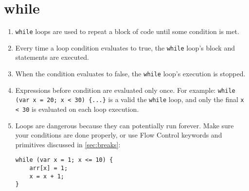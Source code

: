 \section{while}
\label{sec:while}

\begin{enumerate}
\begin{lstlisting}[numbers=none]
while (expression; expression; ... ; condition)  {
	statements 
}
\end{lstlisting}
	\item \lstinline|while| loops are used to repeat a block of code until some condition is met.
	\item Every time a loop condition evaluates to true, the \lstinline|while| loop's block and statements are executed.
	\item When the condition evaluates to false, the \lstinline|while| loop's execution is stopped.
	\item Expressions before condition are evaluated only once. For example: \lstinline|while (var x = 20; x < 30) {...}| is a valid the \lstinline|while| loop, and only the final \lstinline|x < 30| is evaluated on each loop execution.
	\item Loops are dangerous because they can potentially run forever. Make sure your conditions are done properly, or use Flow Control keywords and primitives discussed in \ref{sec:breaks}:
\begin{lstlisting}[numbers=none]
while (var x = 1; x <= 10) {
	arr[x] = 1;
	x = x + 1;
}
\end{lstlisting}
\end{enumerate}
